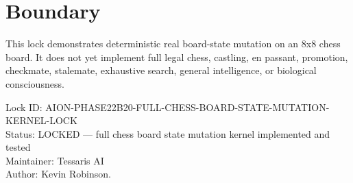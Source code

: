\documentclass[11pt,a4paper]{article}
\begin{document}
\section{Boundary}

This lock demonstrates deterministic real board-state mutation on an 8x8 chess board. It does not yet implement full legal chess, castling, en passant, promotion, checkmate, stalemate, exhaustive search, general intelligence, or biological consciousness.

\bigskip

\noindent
Lock ID: AION-PHASE22B20-FULL-CHESS-BOARD-STATE-MUTATION-KERNEL-LOCK\\
Status: LOCKED --- full chess board state mutation kernel implemented and tested\\
Maintainer: Tessaris AI\\
Author: Kevin Robinson.
\end{document}
